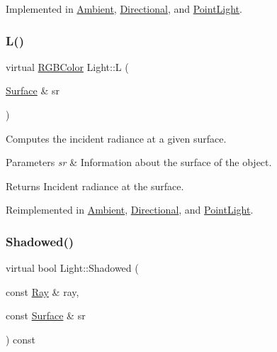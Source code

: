 Implemented in \hyperlink{class_ambient_acb2fc1574883ea0bd41c662ec904164f}{Ambient}, \hyperlink{class_directional_a022fc1cb35f0f760b5472c06ad6e2e74}{Directional}, and \hyperlink{class_point_light_af587fd5a2e72f32fcf5041a2cfb055e1}{Point\+Light}.

\hypertarget{class_light_aba4ca1dcd52876cb5bee71ac8f684af5}{}\label{class_light_aba4ca1dcd52876cb5bee71ac8f684af5} 
\subsubsection{\texorpdfstring{L()}{L()}}
{\footnotesize\ttfamily virtual \hyperlink{class_r_g_b_color}{R\+G\+B\+Color} Light\+::L (\begin{DoxyParamCaption}\item[{\hyperlink{class_surface}{Surface} \&}]{sr }\end{DoxyParamCaption})\hspace{0.3cm}{\ttfamily [virtual]}}

Computes the incident radiance at a given surface. 
\begin{DoxyParams}{Parameters}
{\em sr} & Information about the surface of the object. \\
\hline
\end{DoxyParams}
\begin{DoxyReturn}{Returns}
Incident radiance at the surface. 
\end{DoxyReturn}


Reimplemented in \hyperlink{class_ambient_aa75478ba2b30c9930ef538dd16f4586a}{Ambient}, \hyperlink{class_directional_ac9a728a89d32c5f62ddef2be6c3e467d}{Directional}, and \hyperlink{class_point_light_a0d5e1227bc28f5a26edb595fe443f7f3}{Point\+Light}.

\hypertarget{class_light_ac96c5efcdccb339609c7d19ea6ac5d17}{}\label{class_light_ac96c5efcdccb339609c7d19ea6ac5d17} 
\subsubsection{\texorpdfstring{Shadowed()}{Shadowed()}}
{\footnotesize\ttfamily virtual bool Light\+::\+Shadowed (\begin{DoxyParamCaption}\item[{const \hyperlink{class_ray}{Ray} \&}]{ray,  }\item[{const \hyperlink{class_surface}{Surface} \&}]{sr }\end{DoxyParamCaption}) const\hspace{0.3cm}{\ttfamily [pure virtual]}}

